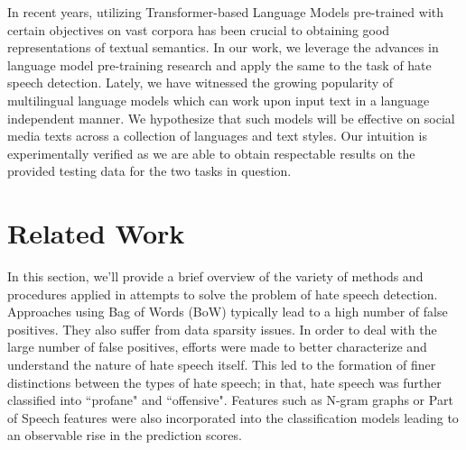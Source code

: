 \documentclass[
]{ceurart}
\begin{document}
In recent years, utilizing Transformer-based\cite{vaswani2017attention} Language Models pre-trained with certain objectives on vast corpora\cite{devlin2018bert} has been crucial to obtaining good representations of textual semantics. In our work, we leverage the advances in language model pre-training research and apply the same to the task of hate speech detection. Lately, we have witnessed the growing popularity of multilingual language models which can work upon input text in a language independent manner. We hypothesize that such models will be effective on social media texts across a collection of languages and text styles. Our intuition is experimentally verified as we are able to obtain respectable results on the provided testing data for the two tasks in question.


\section{Related Work}

In this section, we'll provide a brief overview of the variety of methods and procedures applied in attempts to solve the problem of hate speech detection. Approaches using Bag of Words (BoW)\cite{Kwok2013LocateTH} typically lead to a high number of false positives. They also suffer from data sparsity issues. In order to deal with the large number of false positives, efforts were made to better characterize and understand the nature of hate speech itself. This led to the formation of finer distinctions between the types of hate speech\cite{wang2014cursing}; in that, hate speech was further classified into ``profane" and ``offensive". Features such as N-gram graphs\cite{phdthesis} or Part of Speech features\cite{chen2012detecting} were also incorporated into the classification models leading to an observable rise in the prediction scores. 
\end{document}
